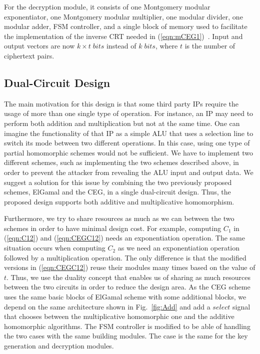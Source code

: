 \documentclass[conference]{IEEEtran}
\begin{document}
For the decryption module, it consists of one Montgomery modular exponentiator, one Montgomery modular multiplier, one modular divider, one modular adder, FSM controller, and a single block of memory used to facilitate the implementation of the inverse CRT needed in (\ref{eqn:mCEG1}){\color{blue}~\cite{homoCRT}}. Input and output vectors are now $k \times t \; bits$ instead of $k \; bits$, where $t$ is the number of ciphertext pairs. 


\subsection{Dual-Circuit Design} 

The main motivation for this design is that some third party IPs require the usage of more than one single type of operation. For instance, an IP may need to perform both addition and multiplication but not at the same time. One can imagine the functionality of that IP as a simple ALU that uses a selection line to switch its mode between two different operations. In this case, using one type of partial homomorphic schemes would not be sufficient. We have to implement two different schemes, such as implementing the two schemes described above, in order to prevent the attacker from revealing the ALU input and output data. We suggest a solution for this issue by combining the two previously proposed schemes, ElGamal and the CEG, in a single dual-circuit design. Thus, the proposed design supports both additive and multiplicative homomorphism.   


Furthermore, we try to share resources as much as we can between the two schemes in order to have minimal design cost. For example, computing $C_1$ in (\ref{eqn:C12}) and (\ref{eqn:CEGC12}) needs an exponentiation operation. The same situation occurs when computing $C_2$ as we need an exponentiation operation followed by a multiplication operation. The only difference is that the modified versions in (\ref{eqn:CEGC12}) reuse their modules many times based on the value of $t$. Thus, we use the duality concept that enables us of sharing as much resources between the two circuits in order to reduce the design area. As the CEG scheme uses the same basic blocks of ElGamal scheme with some additional blocks, we depend on the same architecture shown in Fig.~\ref{fig:Add} and add a $select$ signal that chooses between the multiplicative homomorphic one and the additive homomorphic algorithms. The FSM controller is modified to be able of handling the two cases with the same building modules. The case is the same for the key generation and decryption modules. 
\end{document}
